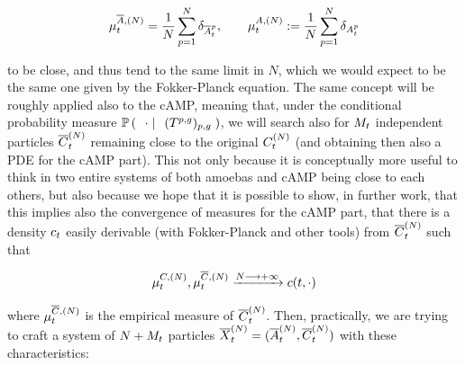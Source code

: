 \begin{equation*}
	\mu_t^{\overline{A},(N)}= \frac{1}{N}\sum_{p=1}^N \delta_{\overline{A}_t^p},\qquad 
	\mu_t^{A,(N)}:= \frac{1}{N}\sum_{p=1}^N \delta_{A_t^p}
\end{equation*}

to be close, and thus tend to the same limit in $N$, which we would expect to be the same one given by the Fokker-Planck equation.
The same concept will be roughly applied also to the cAMP, meaning that, under the conditional probability measure $\mathbb{P} \left( \; \left. \; \cdot \; \right| \; \;(T^{p,g})_{p,g}  \; \right)$, we will search also for $M_t$ independent particles $\overline{C}_t^{(N)}$ remaining close to the original $C_t^{(N)}$ (and obtaining then also a PDE for the cAMP part).
This not only because it is conceptually more useful to  think in two entire systems of both amoebas and cAMP being close to each others, but also because we hope that it is possible to show, in further work, that this implies also the convergence of measures for the cAMP part, \ie that there is a density $c_t$ easily derivable (with Fokker-Planck and other tools) from $\overline{C}_t^{(N)}$ such that 

\begin{equation*}
	\mu_t^{C,(N)}, \mu_t^{\overline{C},(N)} \xrightarrow{N\longrightarrow +\infty} c(t,\cdot)
\end{equation*}

where $\mu_t^{\overline{C},(N)}$ is the empirical measure of $\overline{C}_t^{(N)}$.
Then, practically, we are trying to craft a system of $N+M_t$ particles $\overline{X}_t^{(N)} = (\overline{A}_t^{(N)}, \overline{C}_t^{(N)})$ with these characteristics:

